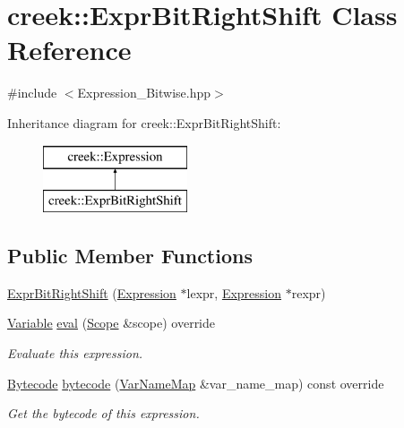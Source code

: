 \hypertarget{classcreek_1_1_expr_bit_right_shift}{}\section{creek\+:\+:Expr\+Bit\+Right\+Shift Class Reference}
\label{classcreek_1_1_expr_bit_right_shift}


{\ttfamily \#include $<$Expression\+\_\+\+Bitwise.\+hpp$>$}

Inheritance diagram for creek\+:\+:Expr\+Bit\+Right\+Shift\+:\begin{figure}[H]
\begin{center}
\leavevmode
\includegraphics[height=2.000000cm]{classcreek_1_1_expr_bit_right_shift}
\end{center}
\end{figure}
\subsection*{Public Member Functions}
\begin{DoxyCompactItemize}
\item 
\hyperlink{classcreek_1_1_expr_bit_right_shift_a93eae94e02e8fae34f38594a15edb7f4}{Expr\+Bit\+Right\+Shift} (\hyperlink{classcreek_1_1_expression}{Expression} $\ast$lexpr, \hyperlink{classcreek_1_1_expression}{Expression} $\ast$rexpr)
\item 
\hyperlink{classcreek_1_1_variable}{Variable} \hyperlink{classcreek_1_1_expr_bit_right_shift_a3029e8ff6053b03a613bff438bceb1f1}{eval} (\hyperlink{classcreek_1_1_scope}{Scope} \&scope) override
\begin{DoxyCompactList}\small\item\em Evaluate this expression. \end{DoxyCompactList}\item 
\hyperlink{classcreek_1_1_bytecode}{Bytecode} \hyperlink{classcreek_1_1_expr_bit_right_shift_a5c6dd23fccb8e58d8218b7fba0df1d55}{bytecode} (\hyperlink{classcreek_1_1_var_name_map}{Var\+Name\+Map} \&var\+\_\+name\+\_\+map) const  override\hypertarget{classcreek_1_1_expr_bit_right_shift_a5c6dd23fccb8e58d8218b7fba0df1d55}{}\label{classcreek_1_1_expr_bit_right_shift_a5c6dd23fccb8e58d8218b7fba0df1d55}

\begin{DoxyCompactList}\small\item\em Get the bytecode of this expression. \end{DoxyCompactList}\end{DoxyCompactItemize}


